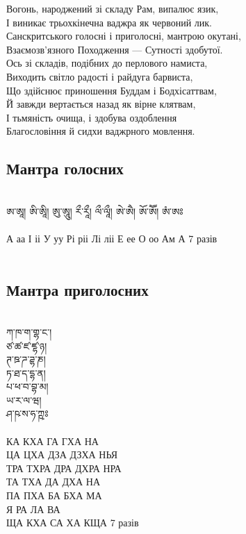 Вогонь, народжений зі складу Рам, випалює язик,\\
І виникає трьохкінечна ваджра як червоний лик.\\
Санскритського голосні і приголосні, мантрою окутані,\\
Взаємозв’язного Походження --- Сутності здобутої.\\
Ось зі складів, подібних до перлового намиста,\\
Виходить світло радості і райдуга барвиста,\\
Що здійснює приношення Буддам і Бодхісаттвам,\\
Й завжди вертається назад як вірне клятвам,\\
І тьмяність очища, і здобува оздоблення\\
Благословіння й сидхи ваджрного мовлення.

\newpage
\subsection*{Мантра голосних}
\\
\ti
ཨ་ཨཱ། ཨི་ཨཱི། ཨུ་ཨཱུ། རྀ་རཱྀ། ལྀ་ལཱྀ། ཨེ་ཨཻ། ཨོ་ཨཽ། ཨཾ་ཨཿ\\
\\
\ru
А аа І іі У уу Рі ріі Лі ліі Е ее О оо Ам А \hspace{1cm} 7 разів\\
\\
\subsection*{Мантра приголосних}
\\
\ti
ཀ་ཁ་ག་གྷ་ང་། \\
ཙ་ཚ་ཛ་ཛྷ་ཉ། \\
ཊ་ཋ་ཌ་ཌྷ་ཎ། \\
ཏ་ཐ་ད་དྷ་ན། \\
པ་ཕ་བ་བྷ་མ། \\
ཡ་ར་ལ་ཝ། \\
ཤ་ཥ་ས་ཧ་ཀྵཿ \\
\\
\ru
КА  КХА  ГА ГХА НА\\
ЦА  ЦХА  ДЗА ДЗХА НЬЯ\\
ТРА ТХРА ДРА ДХРА НРА\\
ТА  ТХА  ДА ДХА НА\\
ПА  ПХА  БА БХА МА\\
Я   РА   ЛА ВА\\
ЩА  КХА  СА ХА КЩА \hspace{1cm} 7 разів\\
\newpage
